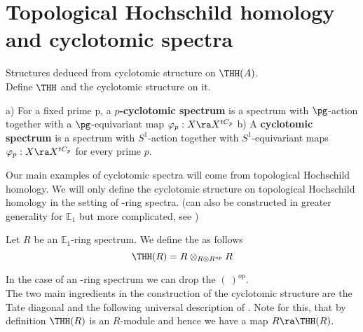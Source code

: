 \chapter{Topological Hochschild homology and cyclotomic spectra}
Structures deduced from cyclotomic structure on $\THH(A)$.
\\
Define $\THH$ and the cyclotomic structure on it. 


\begin{defn}\cite[Chapter~2.1]{NS}
a) For a fixed prime p, a \textbf{$p$-cyclotomic spectrum} is a spectrum with $\pg$-action together with a $\pg$-equivariant map $\varphi_p: X \ra X^{tC_p}$ \newline
b) A \textbf{cyclotomic spectrum} is a spectrum with $S^1$-action together with  $S^1$-equivariant maps $\varphi_p: X \ra X^{tC_p}$ for every prime $p$.
\end{defn}

Our main examples of cyclotomic spectra will come from topological Hochschild homology.
We will only define the cyclotomic structure on topological Hochschild homology in the setting of \Einf-ring spectra. (can also be constructed in greater generality for $\mathbb{E}_1$ but more complicated, see \cite[Chapter~3.2]{NS})
\begin{defn}
Let $R$ be an $\mathbb{E}_1$-ring spectrum.
We define the \thh  as follows
\begin{equation*}
    \THH(R)=R\otimes_{R\otimes R^{op}}R
\end{equation*}
\end{defn}
In the case of an \Einf-ring spectrum we can drop the $(\:)^{op}$. \\
The two main ingredients in the construction of the cyclotomic structure are the Tate diagonal and the following universal description of \thh. Note for this, that by definition $\THH(R)$ is an $R$-module and hence we have a map $R\ra\THH(R)$.

